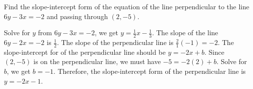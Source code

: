 


Find the slope-intercept form of the equation of the line perpendicular to the line $6y-3x=-2$ and passing through $(2, -5)$.

\begin{solution}
Solve for $y$ from $6y-3x=-2$, we get $y=\frac12x-\frac13$. The slope of the line $6y-2x=-2$ is $\frac12$. The slope of the perpendicular line is $\frac21(-1)=-2$. The slope-intercept for of the perpendicular line should be $y=-2x+b$. Since $(2, -5)$ is on the perpendicular line, we must have $-5=-2(2)+b$. Solve for $b$, we get $b=-1$. Therefore, the slope-intercept form of the perpendicular line is $y=-2x-1$. 
\end{solution}
